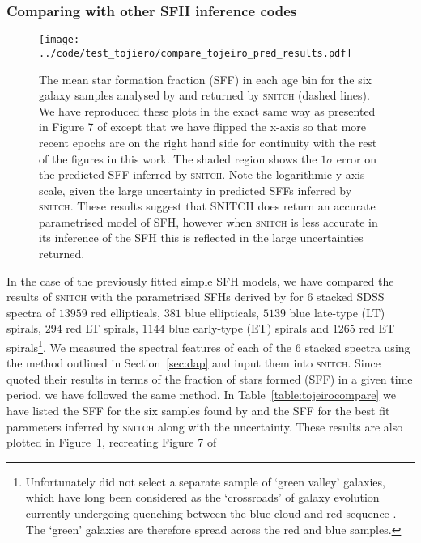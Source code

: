 \documentclass[useAMS,usenatbib]{mn2e}
\begin{document}
\subsubsection{Comparing with other SFH inference codes}\label{secsec:compare}

\begin{figure}
\centering
\texttt{[image: ../code/test\_tojiero/compare\_tojeiro\_pred\_results.pdf]}
\caption{The mean star formation fraction (SFF) in each age bin for the six galaxy samples analysed by \protect\cite[][solid lines]{tojeiro13} and returned by \textsc{snitch} (dashed lines). We have reproduced these plots in the exact same way as presented in Figure 7 of \citeauthor{tojeiro13} except that we have flipped the x-axis so that more recent epochs are on the right hand side for continuity with the rest of the figures in this work. The shaded region shows the $1\sigma$ error on the predicted SFF inferred by \textsc{snitch}. Note the logarithmic y-axis scale, given the large uncertainty in predicted SFFs inferred by \textsc{snitch}. These results suggest that \textsc{SNITCH} does return an accurate parametrised model of SFH, however when \textsc{snitch} is less accurate in its inference of the SFH this is reflected in the large uncertainties returned. }
\label{fig:tojeirocompare}
\end{figure}

In the case of the previously fitted simple SFH models, we have compared the results of \textsc{snitch} with the parametrised SFHs derived by \cite{tojeiro13} for $6$ stacked SDSS spectra of $13959$ red ellipticals, $381$ blue ellipticals, $5139$ blue late-type (LT) spirals, $294$ red LT spirals, $1144$ blue early-type (ET) spirals and $1265$ red ET spirals\footnote{Unfortunately \citeauthor{tojeiro13} did not select a separate sample of `green valley' galaxies, which have long been considered as the `crossroads' of galaxy evolution currently undergoing quenching between the blue cloud and red sequence \citep{smethurst15}. The `green' galaxies are therefore spread across the \protect\citeauthor{tojeiro13} red and blue samples. }. We measured the spectral features of each of the $6$ stacked spectra using the method outlined in Section~\ref{sec:dap} and input them into \textsc{snitch}. Since \cite{tojeiro13} quoted their results in terms of the fraction of stars formed (SFF) in a given time period, we have followed the same method. In Table~\ref{table:tojeirocompare} we have listed the SFF for the six samples found by \citeauthor{tojeiro13} and the SFF for the best fit parameters inferred by \textsc{snitch} along with the uncertainty. These results are also plotted in Figure~\ref{fig:tojeirocompare}, recreating Figure 7 of \citeauthor{tojeiro13}
\end{document}
